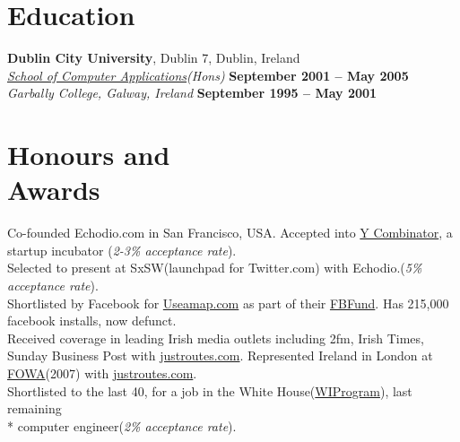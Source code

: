 \documentclass[margin,line]{resume}
\begin{document}
\begin{resume}
    \section{\mysidestyle Education}
    \textbf{Dublin City University}, Dublin 7, Dublin, Ireland \vspace{2mm}\\\vspace{1mm}%
    \textsl{\href{http://www.computing.dcu.ie}{School of Computer Applications}(Hons)} \hfill \textbf{ September 2001 -- May 2005}\\
    \textsl{Garbally College, Galway, Ireland} \hfill \textbf{September 1995 -- May 2001}\vspace{-3mm}\\\vspace{-1mm}%


    \section{\mysidestyle Honours and\\Awards}

    Co-founded Echodio.com in San Francisco, USA. Accepted into \href{http://ycombinator.com/}{Y Combinator}, a startup incubator (\emph{2-3\% acceptance rate}).\vspace{1mm}\\%
    Selected to present at SxSW(launchpad for Twitter.com) with Echodio.(\emph{5\% acceptance rate}).\vspace{1mm}\\%
    Shortlisted by Facebook for \href{http://useamap.}{Useamap.com} as part of their \href{http://fbfund.com/about/}{FBFund}. Has 215,000 facebook installs, now defunct.\vspace{1mm}\\%
    Received coverage in leading Irish media outlets including 2fm, Irish Times, Sunday Business Post with \href{http://justroutes.com}{justroutes.com}. Represented Ireland in London at \href{http://futureofwebapps.com/}{FOWA}(2007) with \href{http://justroutes.com}{justroutes.com}.\vspace{1mm}\\%
    Shortlisted to the last 40, for a job in the White House(\href{http://wiprogram.org/WIP}{WIProgram}), last remaining \\* computer engineer(\emph{2\% acceptance rate}).\vspace{1mm}\\%


\end{resume}
\end{document}
